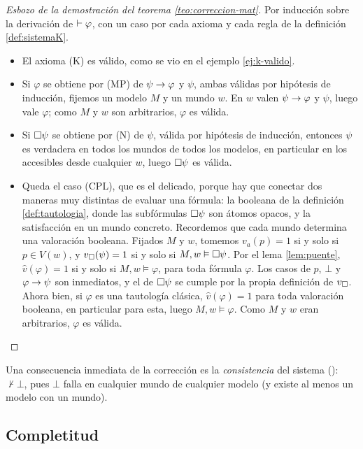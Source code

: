 \begin{proof}[Esbozo de la demostración del teorema \ref{teo:correccion-mat}]
Por inducción sobre la derivación de $\vdash \varphi$, con un caso por cada axioma y cada regla de la definición \ref{def:sistemaK}.

\begin{itemize}
      \item El axioma (K) es válido, como se vio en el ejemplo \ref{ej:k-valido}.
      \item Si $\varphi$ se obtiene por (MP) de $\psi \to \varphi$ y $\psi$, ambas válidas por hipótesis de inducción, fijemos un modelo $M$ y un mundo $w$. En $w$ valen $\psi \to \varphi$ y $\psi$, luego vale $\varphi$; como $M$ y $w$ son arbitrarios, $\varphi$ es válida.
      \item Si $\square\psi$ se obtiene por (N) de $\psi$, válida por hipótesis de inducción, entonces $\psi$ es verdadera en todos los mundos de todos los modelos, en particular en los accesibles desde cualquier $w$, luego $\square\psi$ es válida.
      \item Queda el caso (CPL), que es el delicado, porque hay que conectar dos maneras muy distintas de evaluar una fórmula: la booleana de la definición \ref{def:tautologia}, donde las subfórmulas $\square\psi$ son átomos opacos, y la satisfacción en un mundo concreto. Recordemos que cada mundo determina una valoración booleana. Fijados $M$ y $w$, tomemos $v_a(p) = 1$ si y solo si $p \in V(w)$, y $v_\square(\psi) = 1$ si y solo si $M, w \vDash \square\psi$. Por el lema \ref{lem:puente}, $\hat{v}(\varphi) = 1$ si y solo si $M, w \vDash \varphi$, para toda fórmula $\varphi$. Los casos de $p$, $\bot$ y $\varphi \to \psi$ son inmediatos, y el de $\square\psi$ se cumple por la propia definición de $v_\square$. Ahora bien, si $\varphi$ es una tautología clásica, $\hat{v}(\varphi) = 1$ para toda valoración booleana, en particular para esta, luego $M, w \vDash \varphi$. Como $M$ y $w$ eran arbitrarios, $\varphi$ es válida.
\end{itemize}
\end{proof}



Una consecuencia inmediata de la corrección es la \emph{consistencia} del sistema (): $\nvdash \bot$, pues $\bot$ falla en cualquier mundo de cualquier modelo (y existe al menos un modelo con un mundo).

\subsection*{Completitud}


